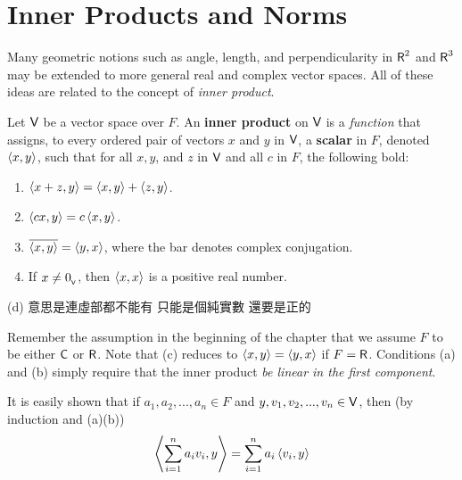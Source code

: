 \section{Inner Products and Norms} \label{sec 6.1}

Many geometric notions such as angle, length, and perpendicularity in \(\textsf{R}^2\) and \(\textsf{R}^3\) may be extended to more general real and complex vector spaces.
All of these ideas are related to the concept of \emph{inner product}.

\begin{definition} \label{def 6.1}
Let \(\textsf{V}\) be a vector space over \(F\).
An \textbf{inner product} on \(\textsf{V}\) is a \emph{function} that assigns, to every ordered pair of vectors \(x\) and \(y\) in \(\textsf{V}\), a \textbf{scalar} in \(F\), denoted \(\left< x, y \right>\), such that for all \(x, y\), and \(z\) in \(\textsf{V}\) and all \(c\) in \(F\), the following bold:
\begin{enumerate}
\item \(\left< x + z, y \right> = \left< x, y \right> + \left< z, y \right>\).
\item \(\left< cx, y \right> = c \left< x, y \right>\).
\item \(\overline{\left< x, y \right>} = \left< y, x \right>\), where the bar denotes complex conjugation.
\item If \(x \ne 0_{_{\textsf{V}}}\), then \(\left< x, x \right>\) is a positive real number.
\end{enumerate}
\end{definition}

\begin{note}
(d) 意思是連虛部都不能有
只能是個純實數 還要是正的
\end{note}

\begin{remark} \label{remark 6.1.1}
Remember the assumption in the beginning of the chapter that we assume \(F\) to be either \(\textsf{C}\) or \(\textsf{R}\).
Note that (c) reduces to \(\left< x, y \right> = \left< y, x \right>\) if \(F = \textsf{R}\).
Conditions (a) and (b) simply require that the inner product \emph{be linear in the first component}.

It is easily shown that if \(a_1, a_2, ..., a_n \in F\) and \(y, v_1, v_2, ..., v_n \in \textsf{V}\), then (by induction and (a)(b))
\[
    \left< \sum_{i = 1}^n a_i v_i, y \right> = \sum_{i = 1}^n a_i \left< v_i, y \right>
\]
\end{remark}

